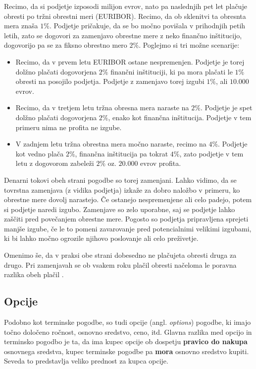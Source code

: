 \documentclass[12pt,a4paper]{amsart}
\theoremstyle{definition} %
\theoremstyle{plain} %
\begin{document}
Recimo, da si podjetje izposodi milijon evrov, nato pa naslednjih pet let plačuje 
obresti po tržni obrestni meri (EURIBOR). Recimo, da ob sklenitvi ta obresnta mera 
znaša $1\%$. Podjetje pričakuje, da se bo močno povišala v prihodnjih petih 
letih, zato se dogovori za zamenjavo obrestne mere z neko finančno inštitucijo, 
dogovorijo pa se za fiksno obrestno mero $2\%$. Poglejmo si tri možne scenarije: 
\begin{itemize}
  \item Recimo, da v prvem letu EURIBOR ostane nespremenjen. Podjetje je torej 
	dolžno plačati dogovorjena $2\%$ finančni inštituciji, ki pa mora plačati le $1\%$ 
	obresti na posojilo podjetja. 
	Podjetje z zamenjavo torej izgubi $1\%$, ali $10.000$ evrov. 
  \item Recimo, da v tretjem letu tržna obresna mera naraste na $2\%$. Podjetje je 
	spet dolžno plačati dogovorjena $2\%$, enako kot finančna inštitucija. 
	Podjetje v tem primeru nima ne profita ne izgube. 
  \item V zadnjem letu tržna obrestna mera močno naraste, recimo na $4\%$. Podjetje 
	kot vedno plača $2\%$, finančna inštitucija pa tokrat $4\%$, zato podjetje v 
	tem letu z dogovorom zabeleži $2\%$ oz. $20.000$ evrov profita.
\end{itemize}

Denarni tokovi obeh strani pogodbe so torej zamenjani.
Lahko vidimo, da se tovrstna zamenjava (z vidika podjetja) izkaže za dobro naložbo v primeru, ko 
obrestne mere dovolj narastejo. Če ostanejo nespremenjene ali celo padejo, 
potem si podjetje naredi izgubo. Zamenjave so zelo uporabne, saj se podjetje 
lahko zaščiti pred povečanjem obrestne mere. Pogosto so podjetja pripravljena 
sprejeti manjše izgube, če le to pomeni zavarovanje pred potencialnimi velikimi 
izgubami, ki bi lahko močno ogrozile njihovo poslovanje ali celo preživetje.

Omenimo še, da v praksi obe strani dobesedno ne plačujeta obresti druga za drugo. Pri 
zamenjavah se ob vsakem roku 
plačil obresti načeloma le poravna razlika obeh plačil . 


\subsection{Opcije}

Podobno kot terminske pogodbe, so tudi opcije (angl. \textit{options}) pogodbe, ki 
imajo točno določeno ročnost, osnovno sredstvo, ceno, itd. Glavna razlika med opcijo 
in terminsko pogodbo je ta, da ima kupec opcije ob dospetju \textbf{pravico do nakupa}
osnovnega sredstva, kupec terminske pogodbe pa \textbf{mora} osnovno sredstvo kupiti. 
Seveda to predstavlja veliko prednost za kupca opcije. 
\end{document}
